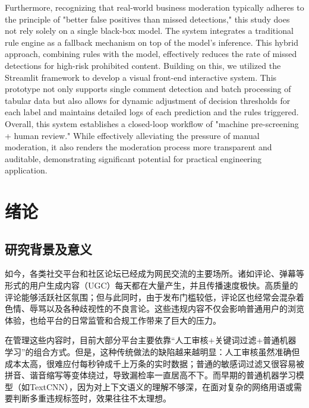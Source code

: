 \documentclass[twoside]{thesis-cls-Miya} %
\begin{document}
\begin{englishabstract}
Furthermore, recognizing that real-world business moderation typically adheres to the principle of "better false positives than missed detections," this study does not rely solely on a single black-box model. The system integrates a traditional rule engine as a fallback mechanism on top of the model's inference. This hybrid approach, combining rules with the model, effectively reduces the rate of missed detections for high-risk prohibited content. Building on this, we utilized the Streamlit framework to develop a visual front-end interactive system. This prototype not only supports single comment detection and batch processing of tabular data but also allows for dynamic adjustment of decision thresholds for each label and maintains detailed logs of each prediction and the rules triggered. Overall, this system establishes a closed-loop workflow of "machine pre-screening + human review." While effectively alleviating the pressure of manual moderation, it also renders the moderation process more transparent and auditable, demonstrating significant potential for practical engineering application.

\end{englishabstract}

\tableofcontents

\mainmatter

\chapter{绪论} 

\section{研究背景及意义}
如今，各类社交平台和社区论坛已经成为网民交流的主要场所。诸如评论、弹幕等形式的用户生成内容（UGC）每天都在大量产生，并且传播速度极快。高质量的评论能够活跃社区氛围；但与此同时，由于发布门槛较低，评论区也经常会混杂着色情、辱骂以及各种歧视性的不良言论。这些违规内容不仅会影响普通用户的浏览体验，也给平台的日常监管和合规工作带来了巨大的压力。

在管理这些内容时，目前大部分平台主要依靠“人工审核+关键词过滤+普通机器学习”的组合方式。但是，这种传统做法的缺陷越来越明显：人工审核虽然准确但成本太高，很难应付每秒钟成千上万条的实时数据；普通的敏感词过滤又很容易被拼音、谐音缩写等变体绕过，导致漏检率一直居高不下。而早期的普通机器学习模型（如TextCNN），因为对上下文语义的理解不够深，在面对复杂的网络用语或需要判断多重违规标签时，效果往往不太理想。
\end{document}
